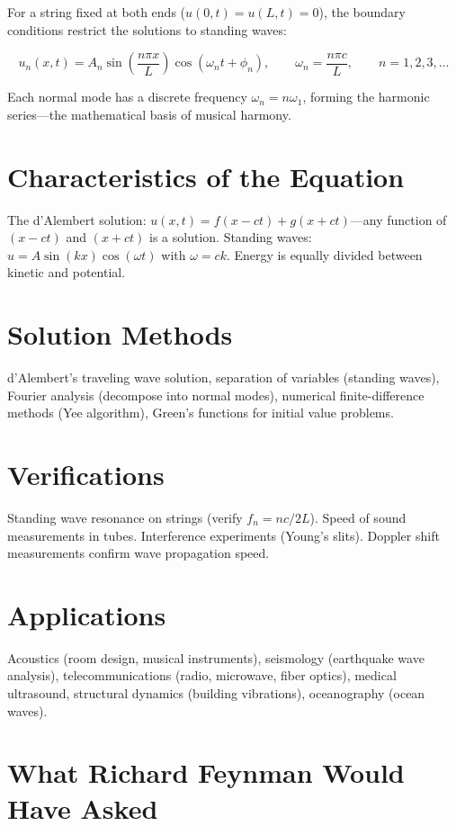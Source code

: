 For a string fixed at both ends ($u(0,t) = u(L,t) = 0$), the boundary conditions restrict the solutions to standing waves:

\begin{equation}
u_n(x,t) = A_n\sin\!\left(\frac{n\pi x}{L}\right)\cos(\omega_n t + \phi_n), \qquad \omega_n = \frac{n\pi c}{L}, \qquad n = 1, 2, 3, \ldots
\end{equation}

Each normal mode has a discrete frequency $\omega_n = n\omega_1$, forming the harmonic series---the mathematical basis of musical harmony.

\section*{Characteristics of the Equation}

The d'Alembert solution: $u(x,t) = f(x - ct) + g(x + ct)$---any function of $(x - ct)$ and $(x + ct)$ is a solution. Standing waves: $u = A \sin(kx)\cos(\omega t)$ with $\omega = ck$. Energy is equally divided between kinetic and potential.
\section*{Solution Methods}

d'Alembert's traveling wave solution, separation of variables (standing waves), Fourier analysis (decompose into normal modes), numerical finite-difference methods (Yee algorithm), Green's functions for initial value problems.
\section*{Verifications}

Standing wave resonance on strings (verify $f_n = nc/2L$). Speed of sound measurements in tubes. Interference experiments (Young's slits). Doppler shift measurements confirm wave propagation speed.
\section*{Applications}

Acoustics (room design, musical instruments), seismology (earthquake wave analysis), telecommunications (radio, microwave, fiber optics), medical ultrasound, structural dynamics (building vibrations), oceanography (ocean waves).
\section*{What Richard Feynman Would Have Asked}

